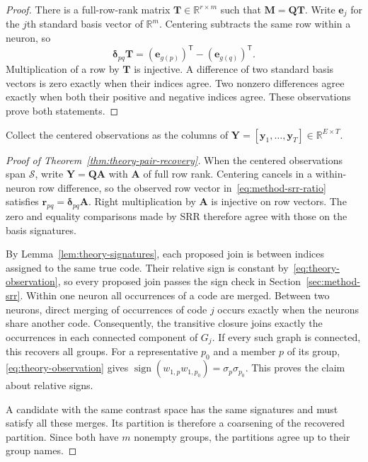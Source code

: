 \begin{proof}
    There is a full-row-rank matrix
    $\mathbf T\in\mathbb R^{r\times m}$ such that
    $\mathbf M=\mathbf Q\mathbf T$.
    Write $\mathbf e_j$ for the $j$th standard basis vector
    of $\mathbb R^m$. Centering subtracts the same row within a
    neuron, so
    \begin{equation*}
        \boldsymbol\delta_{pq}\mathbf T
        =(\mathbf e_{g(p)})^{\mathsf T}
            -(\mathbf e_{g(q)})^{\mathsf T}.
    \end{equation*}
    Multiplication of a row by $\mathbf T$ is injective.
    A difference of two standard basis vectors is zero exactly
    when their indices agree. Two nonzero differences agree
    exactly when both their positive and negative indices agree.
    These observations prove both statements.
\end{proof}

Collect the centered observations as the columns of
$\mathbf Y=[\mathbf y_1,\ldots,\mathbf y_T]\in\mathbb R^{E\times T}$.

\begin{proof}[Proof of Theorem~\ref{thm:theory-pair-recovery}]
    When the centered observations span $\mathcal S$,
    write $\mathbf Y=\mathbf Q\mathbf A$ with $\mathbf A$ of full
    row rank. Centering cancels in a within-neuron row difference,
    so the observed row vector in~\eqref{eq:method-srr-ratio} satisfies
    $\mathbf r_{pq}=\boldsymbol\delta_{pq}\mathbf A$.
    Right multiplication by $\mathbf A$ is injective on row vectors.
    The zero and equality comparisons made by SRR therefore agree
    with those on the basis signatures.

    By Lemma~\ref{lem:theory-signatures}, each proposed join is
    between indices assigned to the same true code. Their relative
    sign is constant by~\eqref{eq:theory-observation}, so every
    proposed join passes the sign check in Section~\ref{sec:method-srr}.
    Within one neuron all occurrences of a code are merged.
    Between two neurons, direct merging of occurrences of code $j$
    occurs exactly when the neurons share another code.
    Consequently, the transitive closure joins exactly the
    occurrences in each connected component of $G_j$.
    If every such graph is connected, this recovers all groups.
    For a representative $p_0$ and a member $p$ of its group,
    \eqref{eq:theory-observation} gives
    $\operatorname{sign}(w_{1,p}w_{1,p_0})
       =\sigma_p\sigma_{p_0}$.
    This proves the claim about relative signs.

    A candidate with the same contrast space has the same
    signatures and must satisfy all these merges.
    Its partition is therefore a coarsening of the recovered
    partition. Since both have $m$ nonempty groups, the partitions
    agree up to their group names.
\end{proof}

